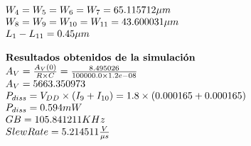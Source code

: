 \begin{equation}
\begin{array}{l l}
		W_{4} = W_{5} = W_{6} = W_{7} =  65.115712  \mu m \\
		W_{8} = W_{9} = W_{10} = W_{11} =  43.600031  \mu m \\
		L_{1} - L_{11} =  0.45  \mu m \\
		\\
		\textbf{Resultados obtenidos de la simulación} \\
		A_{V} = \frac{A_{V}(0)}{R \times C} = \frac{ 8.495026 }{ 100000.0 \times 1.2e-08 } \\
		A_{V} =  5663.350973  \\
		P_{diss} = V_{DD} \times (I_{9}+I_{10}) =  1.8 \times ( 0.000165  +  0.000165 ) \\
		P_{diss} =  0.594  mW \\
		GB =  105.841211  KHz \\
		Slew Rate =  5.214511 \frac{V}{\mu s} \\
	\end{array}
\end{equation}